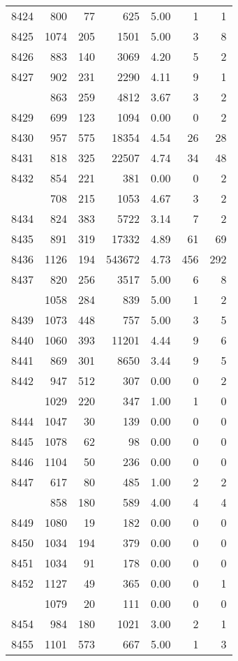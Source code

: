 \documentclass[
]{article}
\begin{document}
\begin{table}
\begin{tabular}[t]{lrrrrrr}
8424 & 800 & 77 & 625 & 5.00 & 1 & 1\\
8425 & 1074 & 205 & 1501 & 5.00 & 3 & 8\\
8426 & 883 & 140 & 3069 & 4.20 & 5 & 2\\
8427 & 902 & 231 & 2290 & 4.11 & 9 & 1\\
\addlinespace
8428 & 863 & 259 & 4812 & 3.67 & 3 & 2\\
8429 & 699 & 123 & 1094 & 0.00 & 0 & 2\\
8430 & 957 & 575 & 18354 & 4.54 & 26 & 28\\
8431 & 818 & 325 & 22507 & 4.74 & 34 & 48\\
8432 & 854 & 221 & 381 & 0.00 & 0 & 2\\
\addlinespace
8433 & 708 & 215 & 1053 & 4.67 & 3 & 2\\
8434 & 824 & 383 & 5722 & 3.14 & 7 & 2\\
8435 & 891 & 319 & 17332 & 4.89 & 61 & 69\\
8436 & 1126 & 194 & 543672 & 4.73 & 456 & 292\\
8437 & 820 & 256 & 3517 & 5.00 & 6 & 8\\
\addlinespace
8438 & 1058 & 284 & 839 & 5.00 & 1 & 2\\
8439 & 1073 & 448 & 757 & 5.00 & 3 & 5\\
8440 & 1060 & 393 & 11201 & 4.44 & 9 & 6\\
8441 & 869 & 301 & 8650 & 3.44 & 9 & 5\\
8442 & 947 & 512 & 307 & 0.00 & 0 & 2\\
\addlinespace
8443 & 1029 & 220 & 347 & 1.00 & 1 & 0\\
8444 & 1047 & 30 & 139 & 0.00 & 0 & 0\\
8445 & 1078 & 62 & 98 & 0.00 & 0 & 0\\
8446 & 1104 & 50 & 236 & 0.00 & 0 & 0\\
8447 & 617 & 80 & 485 & 1.00 & 2 & 2\\
\addlinespace
8448 & 858 & 180 & 589 & 4.00 & 4 & 4\\
8449 & 1080 & 19 & 182 & 0.00 & 0 & 0\\
8450 & 1034 & 194 & 379 & 0.00 & 0 & 0\\
8451 & 1034 & 91 & 178 & 0.00 & 0 & 0\\
8452 & 1127 & 49 & 365 & 0.00 & 0 & 1\\
\addlinespace
8453 & 1079 & 20 & 111 & 0.00 & 0 & 0\\
8454 & 984 & 180 & 1021 & 3.00 & 2 & 1\\
8455 & 1101 & 573 & 667 & 5.00 & 1 & 3\\

\end{tabular}
\end{table}
\end{document}
